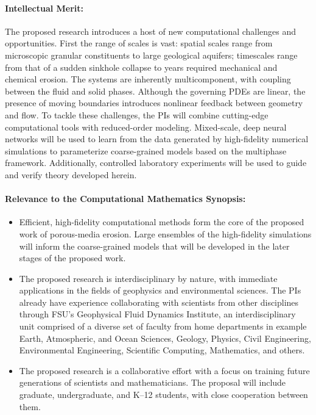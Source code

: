 \documentclass[11pt]{article}
\begin{document}
\paragraph{Intellectual Merit:} The proposed research introduces a host of new computational challenges and opportunities. First the range of scales is vast: spatial scales range from microscopic granular constituents to large geological aquifers; timescales range from that of a sudden sinkhole collapse to years required mechanical and chemical erosion. The systems are inherently multicomponent, with coupling between the fluid and solid phases. Although the governing PDEs are linear, the presence of moving boundaries introduces nonlinear feedback between geometry and flow. To tackle these challenges, the PIs will combine cutting-edge computational tools with reduced-order modeling. Mixed-scale, deep neural networks will be used to learn from the data generated by high-fidelity numerical simulations to parameterize coarse-grained models based on the multiphase framework. Additionally, controlled laboratory experiments will be used to guide and verify theory developed herein.  

\paragraph{Relevance to the Computational Mathematics Synopsis:}
\begin{itemize}[noitemsep]
  \item Efficient, high-fidelity computational methods form the core of the proposed work of porous-media erosion. Large ensembles of the high-fidelity simulations will inform the coarse-grained models that will be developed in the later stages of the proposed work.
  \item The proposed research is interdisciplinary by nature, with immediate applications in the fields of geophysics and environmental sciences. The PIs already have experience collaborating with scientists from other disciplines \cite{Caves2018, eastham2019multiphase, Bolles2019} through FSU's Geophysical Fluid Dynamics Institute, an interdisciplinary unit comprised of a diverse set of faculty from home departments in example Earth, Atmospheric, and Ocean Sciences, Geology, Physics, Civil Engineering, Environmental Engineering, Scientific Computing, Mathematics, and others.
  \item The proposed research is a collaborative effort with a focus on training future generations of scientists and mathematicians. The proposal will include graduate, undergraduate, and K--12 students, with close cooperation between them.
\end{itemize}
\end{document}
